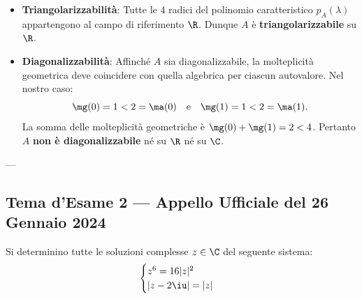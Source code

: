 \begin{dimostrazione}
\begin{itemize}
    \item \textbf{Triangolarizzabilità}: Tutte le 4 radici del polinomio caratteristico $p_A(\lambda)$ appartengono al campo di riferimento $\R$. Dunque $A$ è \textbf{triangolarizzabile} su $\R$.
    \item \textbf{Diagonalizzabilità}: Affinché $A$ sia diagonalizzabile, la molteplicità geometrica deve coincidere con quella algebrica per ciascun autovalore. Nel nostro caso:
    \begin{equation}
        \mg(0) = 1 < 2 = \ma(0) \quad \text{e} \quad \mg(1) = 1 < 2 = \ma(1).
    \end{equation}
    La somma delle molteplicità geometriche è $\mg(0) + \mg(1) = 2 < 4$.
    Pertanto $A$ \textbf{non è diagonalizzabile} né su $\R$ né su $\C$.
\end{itemize}
\end{dimostrazione}

---

\subsection{Tema d'Esame 2 — Appello Ufficiale del 26 Gennaio 2024}

\begin{tcolorbox}[colback=white, colframe=navyblue, title={\textbf{Testo del Problema 1 — Campo Complesso}}]
Si determinino tutte le soluzioni complesse $z \in \C$ del seguente sistema:
\begin{equation}
    \begin{cases}
        z^6 = 16 |z|^2 \\
        |z - 2\iu| = |z|
    \end{cases}
\end{equation}
\end{tcolorbox}

